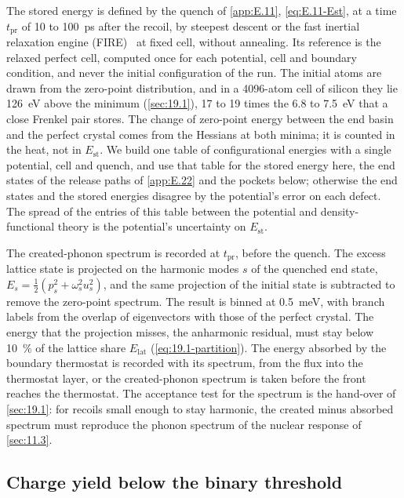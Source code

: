 The stored energy is defined by the quench of \cref{app:E.11}, \cref{eq:E.11-Est}, at a time $t_{\mathrm{pr}}$ of 10 to \SI{100}{ps} after the recoil, by steepest descent or the fast inertial relaxation engine (FIRE)~\cite{bitzek2006structural} at fixed cell, without annealing. Its reference is the relaxed perfect cell, computed once for each potential, cell and boundary condition, and never the initial configuration of the run. The initial atoms are drawn from the zero-point distribution, and in a 4096-atom cell of silicon they lie \SI{126}{eV} above the minimum (\cref{sec:19.1}), 17 to 19 times the 6.8 to \SI{7.5}{eV} that a close Frenkel pair stores. The change of zero-point energy between the end basin and the perfect crystal comes from the Hessians at both minima; it is counted in the heat, not in $E_{\mathrm{st}}$. We build one table of configurational energies with a single potential, cell and quench, and use that table for the stored energy here, the end states of the release paths of \cref{app:E.22} and the pockets below; otherwise the end states and the stored energies disagree by the potential's error on each defect. The spread of the entries of this table between the potential and density-functional theory is the potential's uncertainty on $E_{\mathrm{st}}$.

The created-phonon spectrum is recorded at $t_{\mathrm{pr}}$, before the quench. The excess lattice state is projected on the harmonic modes $s$ of the quenched end state, $E_s = \tfrac12(p_s^2 + \omega_s^2u_s^2)$, and the same projection of the initial state is subtracted to remove the zero-point spectrum. The result is binned at \SI{0.5}{meV}, with branch labels from the overlap of eigenvectors with those of the perfect crystal. The energy that the projection misses, the anharmonic residual, must stay below \SI{10}{\percent} of the lattice share $E_{\mathrm{lat}}$ (\cref{eq:19.1-partition}). The energy absorbed by the boundary thermostat is recorded with its spectrum, from the flux into the thermostat layer, or the created-phonon spectrum is taken before the front reaches the thermostat. The acceptance test for the spectrum is the hand-over of \cref{sec:19.1}: for recoils small enough to stay harmonic, the created minus absorbed spectrum must reproduce the phonon spectrum of the nuclear response of \cref{sec:11.3}.

\subsection{Charge yield below the binary threshold}

